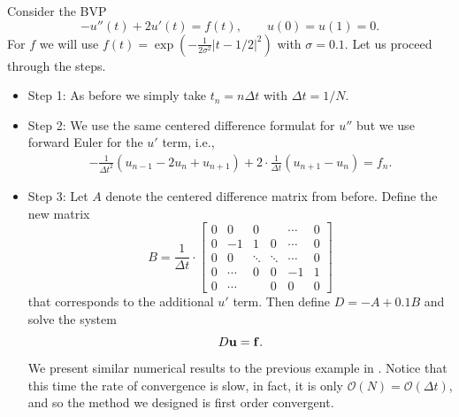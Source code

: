 \begin{example}
    Consider the BVP 
    \begin{equation}\label{eq:l16:adv-diff}
        - u''(t) + 2 u'(t) = f(t), \qquad u(0) = u(1) = 0.
    \end{equation}
    For $f$ we will use 
    $f(t) = \exp( - \frac{1}{2 \sigma^2} | t - 1/2|^2) $ 
    with $\sigma = 0.1$. Let us proceed through the steps. 
    \begin{itemize}
        \item Step 1: As before we simply take $t_n = n \Delta t$ with 
        $\Delta t = 1/N$. 
        \item Step 2: We use the same centered difference 
        formulat for $u''$ but we use forward Euler for the $u'$ term, i.e., 
        \begin{equation*}
            \begin{aligned}
                -\frac{1}{\Delta t^2} (u_{n-1} - 2u_n + u_{n+1} )
                +  2 \cdot \frac{1}{\Delta t} (u_{n+1} - u_n) = f_n.
            \end{aligned}
        \end{equation*}
        \item Step 3: Let $A$ denote the centered difference matrix from before. 
        Define the new matrix
        \begin{equation*}
            B = \frac{1}{\Delta t} \cdot 
            \begin{bmatrix}
                0 & 0 & 0 &  &\cdots  & 0 \\
                0 & -1 & 1 & 0 & \cdots & 0 \\ 
                0  &  0 & \ddots & \ddots & \cdots & 0 \\ 
                0 & \cdots & 0 & 0 & -1 & 1  \\ 
                0 & \cdots & & 0 & 0 & 0
            \end{bmatrix}
        \end{equation*}
        that corresponds to the additional $u'$ term. 
        Then define $D = -A + 0.1 B$ and solve the system 
        \begin{equation*}
            D \mathbf{u} = \mathbf{f}.
        \end{equation*}
        We present similar numerical results to the 
        previous example in . 
        Notice that this time the rate of 
        convergence is slow, in fact, it is only 
        $\mathcal{O}(N) = \mathcal{O}(\Delta t)$, 
        and so the method we designed is first order convergent. 

\end{itemize}
\end{example}
